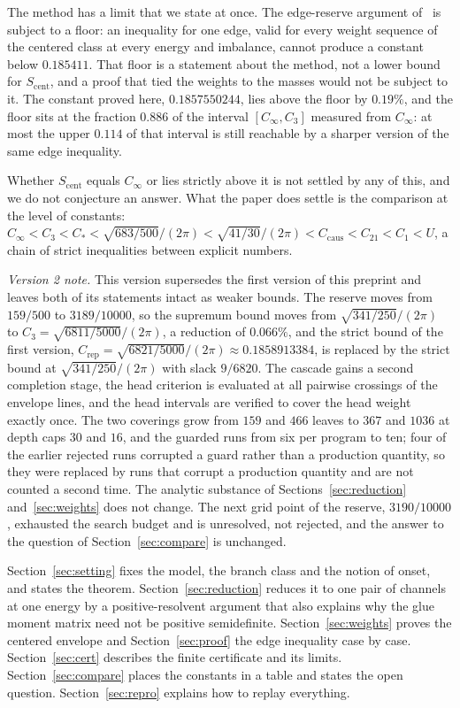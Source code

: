 \documentclass[10pt]{article}
\theoremstyle{remark}
\newcommand{\Cinf}{C_\infty}
\newcommand{\Ccaus}{C_{\mathrm{caus}}}
\newcommand{\Cstar}{C_{*}}
\newcommand{\Cthree}{C_{3}}
\newcommand{\Crep}{C_{\mathrm{rep}}}
\begin{document}
The method has a limit that we state at once. The edge-reserve argument of~\cite{finiteenergy} is subject to a floor: an inequality for one edge, valid for every weight sequence of the centered class at every energy and imbalance, cannot produce a constant below $0.185411$. That floor is a statement about the method, not a lower bound for $S_{\mathrm{cent}}$, and a proof that tied the weights to the masses would not be subject to it. The constant proved here, $0.1857550244$, lies above the floor by $0.19\%$, and the floor sits at the fraction $0.886$ of the interval $[\Cinf,\Cthree]$ measured from $\Cinf$: at most the upper $0.114$ of that interval is still reachable by a sharper version of the same edge inequality.

Whether $S_{\mathrm{cent}}$ equals $\Cinf$ or lies strictly above it is not settled by any of this, and we do not conjecture an answer. What the paper does settle is the comparison at the level of constants: $\Cinf<\Cthree<\Cstar<\sqrt{683/500}/(2\pi)<\sqrt{41/30}/(2\pi)<\Ccaus<C_{21}<C_1<U$, a chain of strict inequalities between explicit numbers.

\emph{Version 2 note.} This version supersedes the first version of this preprint and leaves both of its statements intact as weaker bounds. The reserve moves from $159/500$ to $3189/10000$, so the supremum bound moves from $\sqrt{341/250}/(2\pi)$ to $\Cthree=\sqrt{6811/5000}/(2\pi)$, a reduction of $0.066\%$, and the strict bound of the first version, $\Crep=\sqrt{6821/5000}/(2\pi)\approx0.1858913384$, is replaced by the strict bound at $\sqrt{341/250}/(2\pi)$ with slack $9/6820$. The cascade gains a second completion stage, the head criterion is evaluated at all pairwise crossings of the envelope lines, and the head intervals are verified to cover the head weight exactly once. The two coverings grow from $159$ and $466$ leaves to $367$ and $1036$ at depth caps $30$ and $16$, and the guarded runs from six per program to ten; four of the earlier rejected runs corrupted a guard rather than a production quantity, so they were replaced by runs that corrupt a production quantity and are not counted a second time. The analytic substance of Sections~\ref{sec:reduction} and~\ref{sec:weights} does not change. The next grid point of the reserve, $3190/10000$, exhausted the search budget and is unresolved, not rejected, and the answer to the question of Section~\ref{sec:compare} is unchanged.

Section~\ref{sec:setting} fixes the model, the branch class and the notion of onset, and states the theorem. Section~\ref{sec:reduction} reduces it to one pair of channels at one energy by a positive-resolvent argument that also explains why the glue moment matrix need not be positive semidefinite. Section~\ref{sec:weights} proves the centered envelope and Section~\ref{sec:proof} the edge inequality case by case. Section~\ref{sec:cert} describes the finite certificate and its limits. Section~\ref{sec:compare} places the constants in a table and states the open question. Section~\ref{sec:repro} explains how to replay everything.
\end{document}
